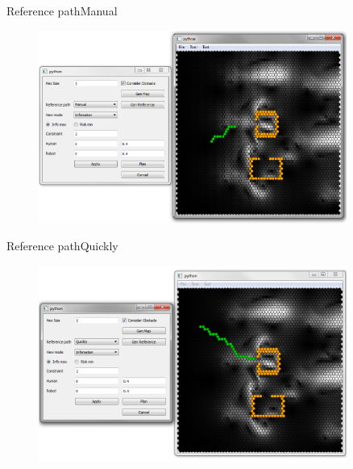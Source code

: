 \begin{frame}{Reference path}{Manual}

\begin{figure}
\centering
\includegraphics[width = 0.9\textwidth]{./screenshot/manual_reference_path.png}
\end{figure}

\end{frame}

\begin{frame}{Reference path}{Quickly}

\begin{figure}
\centering
\includegraphics[width = 0.9\textwidth]{./screenshot/quickly_reference_path.png}
\end{figure}

\end{frame}

